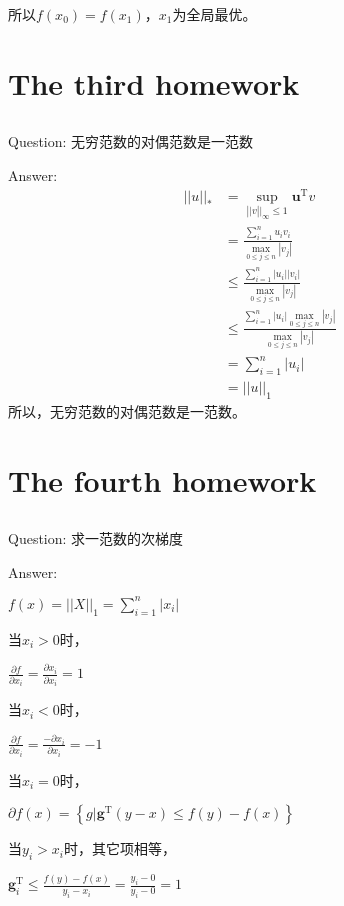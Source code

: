 \documentclass[UTF8]{ctexart}
\begin{document}
所以$f(x_0) = f(x_1)$，$x_1$为全局最优。

\section{The third homework}
\subsection{}
Question:
无穷范数的对偶范数是一范数

Answer:
\begin{align}\nonumber
|\lvert u |\lvert_* &= \sup \limits_{|\lvert v |\lvert_\infty \leq 1} \mathbf{u}^\mathrm{T}v  \\ \nonumber
                    &= \frac{\sum_{i=1}^n u_iv_i}{\max \limits_{0\leq j \leq n}|v_j|}  \\ \nonumber
               & \leq \frac{\sum_{i=1}^n |u_i||v_i|}{\max \limits_{0\leq j \leq n}|v_j|}  \\ \nonumber
     & \leq \frac{\sum_{i=1}^n |u_i|\max \limits_{0\leq j \leq n}|v_j|}{\max \limits_{0\leq j \leq n}|v_j|}  \\ \nonumber  &= \sum_{i=1}^n |u_i|  \\ \nonumber
          &= |\lvert u |\lvert_1
\end{align}
所以，无穷范数的对偶范数是一范数。

\section{The fourth homework}
\subsection{}
Question:
求一范数的次梯度

Answer:

$f(x) = |\lvert X |\lvert_1 = \sum_{i = 1}^n |x_i|$

当$x_i > 0$时，

$ \frac{\partial f}{\partial x_i}=\frac{\partial x_i}{\partial x_i}= 1  $

当$x_i < 0$时，

$ \frac{\partial f}{\partial x_i}=\frac{-\partial x_i}{\partial x_i}= -1  $

当$x_i = 0$时，

$\partial {f(x)} = \left\{g|\mathbf{g}^\mathrm{T}(y - x) \leq f(y) - f(x)\right\}$

当$y_i > x_i$时，其它项相等，

$\mathbf{g}^\mathrm{T}_i \leq \frac{f(y) - f(x)}{y_i - x_i} = \frac{y_i - 0}{y_i - 0} = 1$
\end{document}
